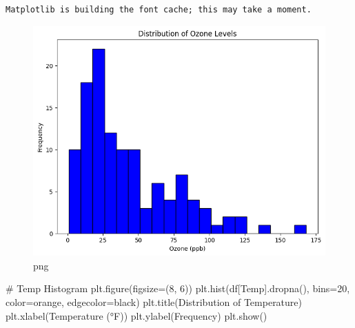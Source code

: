 \documentclass[
  letterpaper,
  DIV=11,
  numbers=noendperiod]{scrreprt}
\newenvironment{Shaded}{\begin{snugshade}}{\end{snugshade}}
\newcommand{\CommentTok}[1]{\textcolor[rgb]{0.37,0.37,0.37}{#1}}
\newcommand{\DecValTok}[1]{\textcolor[rgb]{0.68,0.00,0.00}{#1}}
\newcommand{\NormalTok}[1]{\textcolor[rgb]{0.00,0.23,0.31}{#1}}
\newcommand{\OperatorTok}[1]{\textcolor[rgb]{0.37,0.37,0.37}{#1}}
\newcommand{\StringTok}[1]{\textcolor[rgb]{0.13,0.47,0.30}{#1}}
\begin{document}
\begin{verbatim}
Matplotlib is building the font cache; this may take a moment.
\end{verbatim}

\begin{figure}[H]

{\centering \includegraphics{Tut2_Python_Pena_092024_files/Tut2_Python_Pena_092024_9_1.png}

}

\caption{png}

\end{figure}%

\begin{Shaded}
\begin{Highlighting}[]
\CommentTok{\# Temp Histogram}
\NormalTok{plt.figure(figsize}\OperatorTok{=}\NormalTok{(}\DecValTok{8}\NormalTok{, }\DecValTok{6}\NormalTok{))}
\NormalTok{plt.hist(df[}\StringTok{\textquotesingle{}Temp\textquotesingle{}}\NormalTok{].dropna(), bins}\OperatorTok{=}\DecValTok{20}\NormalTok{, color}\OperatorTok{=}\StringTok{\textquotesingle{}orange\textquotesingle{}}\NormalTok{, edgecolor}\OperatorTok{=}\StringTok{\textquotesingle{}black\textquotesingle{}}\NormalTok{)}
\NormalTok{plt.title(}\StringTok{\textquotesingle{}Distribution of Temperature\textquotesingle{}}\NormalTok{)}
\NormalTok{plt.xlabel(}\StringTok{\textquotesingle{}Temperature (°F)\textquotesingle{}}\NormalTok{)}
\NormalTok{plt.ylabel(}\StringTok{\textquotesingle{}Frequency\textquotesingle{}}\NormalTok{)}
\NormalTok{plt.show()}
\end{Highlighting}
\end{Shaded}
\end{document}
